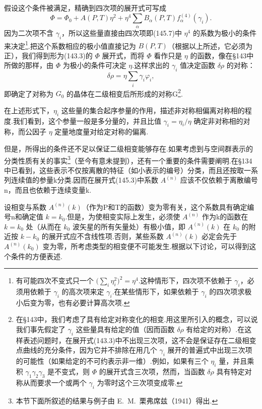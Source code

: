 假设这个条件被满足，精确到四次项的展开式可写成
\begin{equation}
  \Phi=\Phi_0+A(P,T)\eta^2+\eta^4\sum_\alpha B_\alpha(P,T)f_\alpha^{(4)}(\gamma_i).
\end{equation}
因为二次项不含 $\gamma_i$，所以这些量直接由四次项即(145.7)中 $\eta^4$ 的系数为极小的条件来决定\footnote{有可能四次不变式只一个 $\bigl(\sum_i\eta_i^2\bigr)^2=\eta^4$.这种情形下，四次项不依赖于 $\gamma_i$，必须用依赖于 $\gamma_i$ 的高次项来定 $\gamma_i$.在某些情形下，如果依赖于 $\gamma_i$ 的四次项求极小后变为零，也有必要计算高次项.}.把这个系数相应的极小值直接记为 $B(P,T)$（根据以上所述，它必须为正），我们得到形为(143.3)的 $\Phi$ 展开式，而将 $\Phi$ 看作只是 $\eta$ 的函数，像在§143中所做的那样，由 $\Phi$ 为极小的条件可决定 $\eta$.这样求出的 $\gamma_i$ 值决定函数 $\delta\rho$ 的对称：
\begin{equation}
  \delta\rho=\eta\sum_i\gamma_i\varphi_i,
\end{equation}
即确定了对称为 $G_0$ 的晶体在二级相变后所形成的对称G\footnote{在§143中，我们考虑了具有给定对称变化的相变.用这里所引入的概念，可以说我们事先假定了 $\gamma_i$ 这些量具有给定的值（因而函数 $\delta\rho$ 有给定的对称）.在这样表述问题时，在展开式(143.3)中不出现三次项，这不会是保证存在二级相变点曲线的充分条件，因为它并不排除在用几个 $\gamma_i$ 展开的普遍式中出现三次项的可能性（如果给定的不可约表示非一维）.例如，如果有三个 $\eta_i$ 量，并且乘积 $\gamma_1\gamma_2\gamma_3$ 是不变式，则 $\Phi$ 的展开式含三次项，然而，当函数 $\delta\rho$ 具有特定对称从而要求一个或两个 $\gamma_i$ 为零时这个三次项变成零.}.

在上述形式下，$\eta_i$ 这些量的集合起序参量的作用，描述非对称相偏离对称相的程度.我们看到，这个参量一般是多分量的，并且比值 $\gamma_i=\eta_i/\eta$ 确定非对称相的对称，而公因子 $\eta$ 定量地度量对给定对称的偏离.

但是，所得出的条件还不足以保证二级相变能够存在.如果考虑到与空间群表示的分类性质有关的事实\footnote{本节下面所叙述的结果与例子由 E.~M.~栗弗席兹（1941）得出.}（至今有意未提到），还有一个重要的条件需要阐明.在§134中已看到，这些表示不仅按离散的特征（如小表示的编号）分类，而且还按取一系列连续值的参量k分类.因而在展开式(145.3)中系数 $A^{(n)}$ 应该不仅依赖于离散编号n，而且也依赖于连续变量k.

设相变与系数 $A^{(n)}(k)$（作为P和T的函数）变为零有关，这个系数具有确定编号n和确定值 $k=k_0$.但是，为使相变实际上发生，必须使 $A^{(n)}$ 作为k的函数在 $k=k_0$ 处（从而在 $k_0$ 波矢星的所有矢量处）有极小值，即 $A^{(n)}(k)$ 在 $k_0$ 的附近按 $k-k_0$ 的展开式应不含线性项.否则，某些系数 $A^{(n)}(k)$ 必定会先于 $A^{(n)}(k_0)$ 变为零，所考虑类型的相变便不可能发生.根据以下讨论，可以得到这个条件的方便表述.

